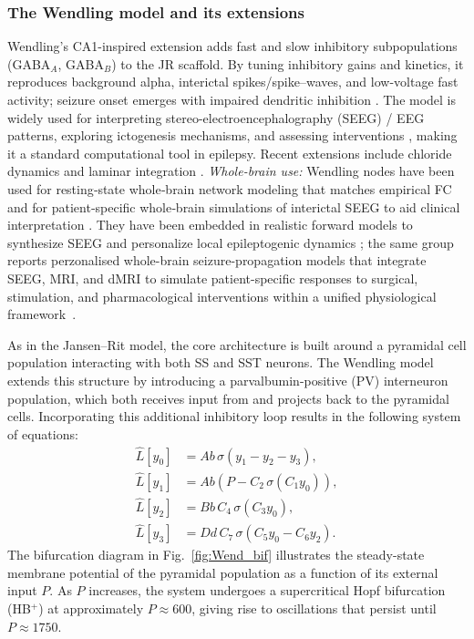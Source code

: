 \documentclass[12pt]{article}
\numberwithin{equation}{section}
\newcommand{\rev}[1]{\begingroup\color{navyblue}#1\endgroup}
\begin{document}
\subsubsection*{The Wendling model and its extensions}
Wendling’s CA1-inspired extension adds fast and slow inhibitory subpopulations (GABA$_A$, GABA$_B$) to the JR scaffold. By tuning inhibitory gains and kinetics, it reproduces background alpha, interictal spikes/spike–waves, and low-voltage fast activity; seizure onset emerges with impaired dendritic inhibition \cite{Wendling2002}. The model is widely used for interpreting stereo-electroencephalography (SEEG) / EEG patterns, exploring ictogenesis mechanisms, and assessing interventions \cite{Wendling2016Review}, making it a standard computational tool in epilepsy. Recent extensions include chloride dynamics and laminar integration \cite{lopez-solaPersonalizableAutonomousNeural2022}.
\textit{Whole-brain use:} Wendling nodes have been used for resting‑state whole‑brain network modeling that matches empirical FC \cite{Cui2024WendlingWBNM} and for patient‑specific whole‑brain simulations of interictal SEEG to aid clinical interpretation \cite{KoksalErsuz2024SEEGWB}.
They have been embedded in realistic forward models to synthesize SEEG and personalize local epileptogenic dynamics \cite{lopez-solaPersonalizableAutonomousNeural2022}; 
the same group reports perzonalised whole-brain seizure-propagation models that integrate SEEG, MRI, and dMRI to simulate patient-specific responses to surgical, stimulation, and pharmacological interventions within a unified physiological framework~\cite{LopezSola2025WB}.

\rev{As in the Jansen–Rit model, the core architecture is built around a pyramidal cell population interacting with both SS and SST neurons. The Wendling model extends this structure by introducing a parvalbumin-positive (PV) interneuron population, which both receives input from and projects back to the pyramidal cells. Incorporating this additional inhibitory loop results in the following system of equations:
\begin{equation}\label{eq:nmm1-Wen}
\begin{aligned}
\hat{L}[y_0] &= A b \, \sigma(y_1 - y_2 - y_3), \\
\hat{L}[y_1] &= A b \left(P - C_2 \, \sigma(C_1 y_0) \right),\\
\hat{L}[y_2] &= B b \, C_4 \, \sigma(C_3 y_0),  \\
\hat{L}[y_3] &= D d \, C_7 \, \sigma(C_5 y_0 - C_6 y_2).
\end{aligned}
\end{equation}
The bifurcation diagram in Fig.~\ref{fig:Wend_bif} illustrates the steady-state membrane potential of the pyramidal population as a function of its external input $P$. As $P$ increases, the system undergoes a supercritical Hopf bifurcation (HB$^{+}$) at approximately $P \approx 600$, giving rise to oscillations that persist until $P \approx 1750$.}
\end{document}
